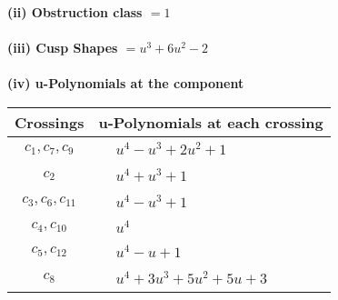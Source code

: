 \documentclass[1p]{elsarticle_modified}
\theoremstyle{definition}
\begin{document}
\flushleft \textbf{(ii) Obstruction class $= 1$}\\~\\
\flushleft \textbf{(iii) Cusp Shapes $= u^3+6 u^2-2$}\\~\\
\newpage\renewcommand{\arraystretch}{1}
\flushleft \textbf{(iv) u-Polynomials at the component}\newline \\
\begin{tabular}{m{50pt}|m{274pt}}
Crossings & \hspace{64pt}u-Polynomials at each crossing \\
\hline $$\begin{aligned}c_{1},c_{7},c_{9}\end{aligned}$$&$\begin{aligned}
&u^4- u^3+2 u^2+1
\end{aligned}$\\
\hline $$\begin{aligned}c_{2}\end{aligned}$$&$\begin{aligned}
&u^4+u^3+1
\end{aligned}$\\
\hline $$\begin{aligned}c_{3},c_{6},c_{11}\end{aligned}$$&$\begin{aligned}
&u^4- u^3+1
\end{aligned}$\\
\hline $$\begin{aligned}c_{4},c_{10}\end{aligned}$$&$\begin{aligned}
&u^4
\end{aligned}$\\
\hline $$\begin{aligned}c_{5},c_{12}\end{aligned}$$&$\begin{aligned}
&u^4- u+1
\end{aligned}$\\
\hline $$\begin{aligned}c_{8}\end{aligned}$$&$\begin{aligned}
&u^4+3 u^3+5 u^2+5 u+3
\end{aligned}$\\
\hline
\end{tabular}\\~\\
\end{document}
